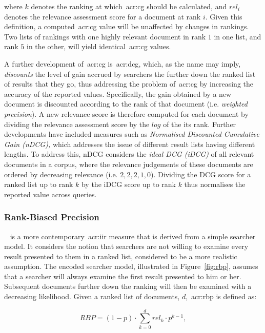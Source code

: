 where $k$ denotes the ranking at which~\gls{acr:cg} should be calculated, and $rel_i$ denotes the relevance assessment score for a document at rank $i$. Given this definition, a computed~\gls{acr:cg} value will be unaffected by changes in rankings. Two lists of rankings with one highly relevant document in rank $1$ in one list, and rank $5$ in the other, will yield identical~\gls{acr:cg} values.

A further development of~\gls{acr:cg} is~\gls{acr:dcg}, which, as the name may imply, \emph{discounts} the level of gain accrued by searchers the further down the ranked list of results that they go, thus addressing the problem of~\gls{acr:cg} by increasing the accuracy of the reported values. Specifically, the gain obtained by a new document is discounted according to the rank of that document (i.e. \emph{weighted precision}). A new relevance score is therefore computed for each document by dividing the relevance assessment score by the $log$ of the its rank. Further developments have included measures such as \emph{Normalised Discounted Cumulative Gain (nDCG),} which addresses the issue of different result lists having different lengths. To address this, nDCG considers the \emph{ideal DCG (iDCG)} of all relevant documents in a corpus, where the relevance judgements of these documents are ordered by decreasing relevance (i.e. $2,2,2,1,0$). Dividing the DCG score for a ranked list up to rank $k$ by the iDCG score up to rank $k$ thus normalises the reported value across queries.

\subsubsection{Rank-Biased Precision}
~\citep{moffat2008rbp} is a more contemporary~\gls{acr:iir} measure that is derived from a simple searcher model. It considers the notion that searchers are not willing to examine every result presented to them in a ranked list, considered to be a more realistic assumption. The encoded searcher model, illustrated in Figure~\ref{fig:rbp}, assumes that a searcher will always examine the first result presented to him or her. Subsequent documents further down the ranking will then be examined with a decreasing likelihood. Given a ranked list of documents, $d$,~\gls{acr:rbp} is defined as:

\begin{equation*}
RBP = (1 - p) \cdot \sum_{k=0}^{d}rel_k \cdot p^{k-1},
\end{equation*}

